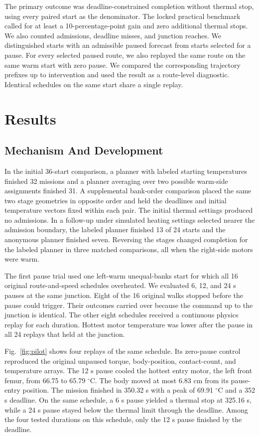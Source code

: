 \documentclass{ieeeaccess}
\begin{document}
The primary outcome was deadline-constrained completion without thermal stop, using every paired start as the denominator. The locked practical benchmark called for at least a 10-percentage-point gain and zero additional thermal stops. We also counted admissions, deadline misses, and junction reaches. We distinguished starts with an admissible paused forecast from starts selected for a pause. For every selected paused route, we also replayed the same route on the same warm start with zero pause. We compared the corresponding trajectory prefixes up to intervention and used the result as a route-level diagnostic. Identical schedules on the same start share a single replay.

\section{Results}

\subsection{Mechanism And Development}
\label{sec:development}

In the initial 36-start comparison, a planner with labeled starting temperatures finished 32 missions and a planner averaging over two possible warm-side assignments finished 31. A supplemental bank-order comparison placed the same two stage geometries in opposite order and held the deadlines and initial temperature vectors fixed within each pair. The initial thermal settings produced no admissions. In a follow-up under simulated heating settings selected nearer the admission boundary, the labeled planner finished 13 of 24 starts and the anonymous planner finished seven. Reversing the stages changed completion for the labeled planner in three matched comparisons, all when the right-side motors were warm.

The first pause trial used one left-warm unequal-banks start for which all 16 original route-and-speed schedules overheated. We evaluated 6, 12, and 24 s pauses at the same junction. Eight of the 16 original walks stopped before the pause could trigger. Their outcomes carried over because the command up to the junction is identical. The other eight schedules received a continuous physics replay for each duration. Hottest motor temperature was lower after the pause in all 24 replays that held at the junction.

Fig.~\ref{fig:pilot} shows four replays of the same schedule. Its zero-pause control reproduced the original unpaused torque, body-position, contact-count, and temperature arrays. The 12 s pause cooled the hottest entry motor, the left front femur, from 66.75 to 65.79 \ensuremath{{}^{\circ}\mathrm{C}}. The body moved at most 6.83 cm from its pause-entry position. The mission finished in 350.32 s with a peak of 69.91 \ensuremath{{}^{\circ}\mathrm{C}} and a 352 s deadline. On the same schedule, a 6 s pause yielded a thermal stop at 325.16 s, while a 24 s pause stayed below the thermal limit through the deadline. Among the four tested durations on this schedule, only the 12 s pause finished by the deadline.
\end{document}
